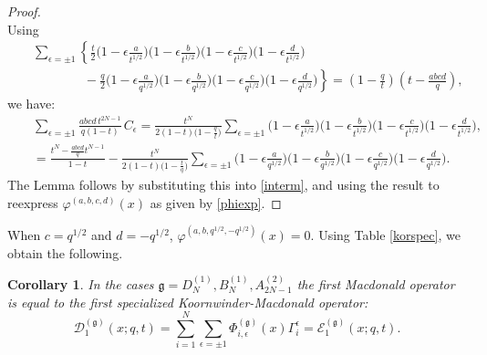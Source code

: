 \documentclass[12pt]{amsart}
\newtheorem{cor}[thm]{Corollary}
\newcommand{\g}{{\mathfrak{g}}}
\newcommand{\D}{{\mathcal{D}}}
\numberwithin{equation}{section}
\begin{document}
\begin{proof}
\begin{equation}
\end{equation}
Using
\begin{eqnarray*}&&\sum_{\epsilon=\pm 1} \left\{\frac{t}{2}\big(1-\epsilon\frac{a}{t^{1/2}}\big)\big(1-\epsilon\frac{b}{t^{1/2}}\big)\big(1-\epsilon\frac{c}{t^{1/2}}\big)\big(1-\epsilon\frac{d}{t^{1/2}}\big)
\right.\\
&&\left. \qquad \qquad 
- \frac{q}{2}\big(1-\epsilon\frac{a}{q^{1/2}}\big)\big(1-\epsilon\frac{b}{q^{1/2}}\big)\big(1-\epsilon\frac{c}{q^{1/2}}\big)\big(1-\epsilon\frac{d}{q^{1/2}}\big)\right\}=\left(1-\frac{q}{t}\right)\left(t-\frac{abcd}{q}\right),
\end{eqnarray*}
we have:
\begin{eqnarray*}
&&\sum_{\epsilon=\pm 1}\frac{abcd\, t^{2N-1}}{q(1-t)}\,C_{\epsilon}=\frac{t^N}{2(1-t)\big(1-\frac{q}{t}\big)}
\sum_{\epsilon=\pm 1} \big(1-\epsilon\frac{a}{t^{1/2}}\big)\big(1-\epsilon\frac{b}{t^{1/2}}\big)\big(1-\epsilon\frac{c}{t^{1/2}}\big)\big(1-\epsilon\frac{d}{t^{1/2}}\big),\\
&&=\frac{t^N- \frac{abcd}{q}t^{N-1}}{1-t}-\frac{t^N}{2(1-t)\big(1-\frac{t}{q}\big)}\sum_{\epsilon=\pm 1} \big(1-\epsilon\frac{a}{q^{1/2}}\big)\big(1-\epsilon\frac{b}{q^{1/2}}\big)\big(1-\epsilon\frac{c}{q^{1/2}}\big)\big(1-\epsilon\frac{d}{q^{1/2}}\big).
\end{eqnarray*}
The Lemma follows by substituting this into \eqref{interm}, and using the result to reexpress $\varphi^{(a,b,c,d)}(x)$
as given by \eqref{phiexp}.
\end{proof}

When  $c=q^{1/2}$ and $d=-q^{1/2}$,  $\varphi^{(a,b,q^{1/2},-q^{1/2})}(x)=0$. Using Table \ref{korspec}, we obtain the following.
\begin{cor}\label{lesmemes}
In the cases $\g=D_N^{(1)},B_N^{(1)}, A_{2N-1}^{(2)}$ the first Macdonald operator is equal to the first specialized Koornwinder-Macdonald operator:
\begin{equation}\label{simpD}
\D_1^{(\g)}(x;q,t)=\sum_{i=1}^N\sum_{\epsilon=\pm 1} \Phi_{i,\epsilon}^{(\g)}(x) \Gamma_i^{\epsilon}={\mathcal E}_1^{(\g)}(x;q,t).
\end{equation}
%
\end{cor}
\end{document}
